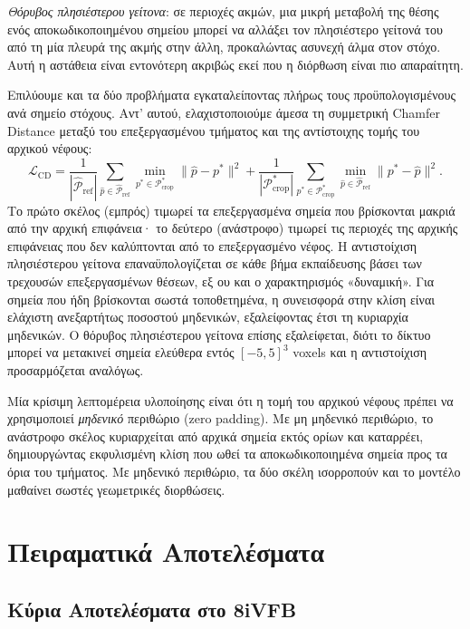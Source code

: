 \emph{Θόρυβος πλησιέστερου γείτονα}: σε περιοχές ακμών, μια μικρή μεταβολή της
θέσης ενός αποκωδικοποιημένου σημείου μπορεί να αλλάξει τον πλησιέστερο γείτονά
του από τη μία πλευρά της ακμής στην άλλη, προκαλώντας ασυνεχή άλμα στον στόχο.
Αυτή η αστάθεια είναι εντονότερη ακριβώς εκεί που η διόρθωση είναι πιο απαραίτητη.

Επιλύουμε και τα δύο προβλήματα εγκαταλείποντας πλήρως τους προϋπολογισμένους
ανά σημείο στόχους.
Αντ' αυτού, ελαχιστοποιούμε άμεσα τη συμμετρική Chamfer Distance μεταξύ του
επεξεργασμένου τμήματος και της αντίστοιχης τομής του αρχικού νέφους:
\[
  \mathcal{L}_{\mathrm{CD}} =
    \frac{1}{|\hat{\mathcal{P}}_{\mathrm{ref}}|}
    \sum_{\hat{p} \in \hat{\mathcal{P}}_{\mathrm{ref}}}
      \min_{p^* \in \mathcal{P}^*_{\mathrm{crop}}} \|\hat{p} - p^*\|^2
    +
    \frac{1}{|\mathcal{P}^*_{\mathrm{crop}}|}
    \sum_{p^* \in \mathcal{P}^*_{\mathrm{crop}}}
      \min_{\hat{p} \in \hat{\mathcal{P}}_{\mathrm{ref}}} \|p^* - \hat{p}\|^2.
\]
Το πρώτο σκέλος (εμπρός) τιμωρεί τα επεξεργασμένα σημεία που βρίσκονται μακριά
από την αρχική επιφάνεια· το δεύτερο (ανάστροφο) τιμωρεί τις περιοχές της αρχικής
επιφάνειας που δεν καλύπτονται από το επεξεργασμένο νέφος.
Η αντιστοίχιση πλησιέστερου γείτονα επαναϋπολογίζεται σε κάθε βήμα εκπαίδευσης
βάσει των τρεχουσών επεξεργασμένων θέσεων, εξ ου και ο χαρακτηρισμός «δυναμική».
Για σημεία που ήδη βρίσκονται σωστά τοποθετημένα, η συνεισφορά στην κλίση είναι
ελάχιστη ανεξαρτήτως ποσοστού μηδενικών, εξαλείφοντας έτσι τη κυριαρχία μηδενικών.
Ο θόρυβος πλησιέστερου γείτονα επίσης εξαλείφεται, διότι το δίκτυο μπορεί να
μετακινεί σημεία ελεύθερα εντός $[-5,5]^3$ voxels και η αντιστοίχιση προσαρμόζεται
αναλόγως.

Μία κρίσιμη λεπτομέρεια υλοποίησης είναι ότι η τομή του αρχικού νέφους πρέπει να
χρησιμοποιεί \emph{μηδενικό} περιθώριο (zero padding).
Με μη μηδενικό περιθώριο, το ανάστροφο σκέλος κυριαρχείται από αρχικά σημεία εκτός
ορίων και καταρρέει, δημιουργώντας εκφυλισμένη κλίση που ωθεί τα αποκωδικοποιημένα
σημεία προς τα όρια του τμήματος.
Με μηδενικό περιθώριο, τα δύο σκέλη ισορροπούν και το μοντέλο μαθαίνει σωστές
γεωμετρικές διορθώσεις.

\section{Πειραματικά Αποτελέσματα}

\subsection{Κύρια Αποτελέσματα στο 8iVFB}

